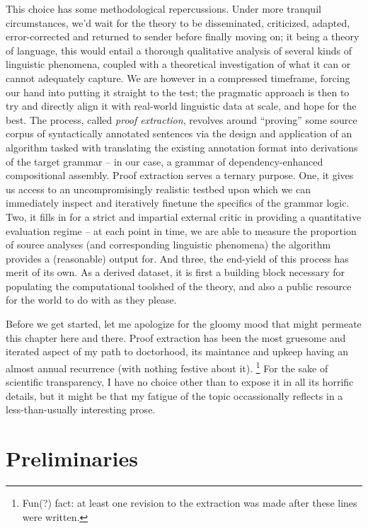 This choice has some methodological repercussions.
Under more tranquil circumstances, we'd wait for the theory to be disseminated, criticized, adapted, error-corrected and returned to sender before finally moving on; it being a theory of language, this would entail a thorough qualitative analysis of several kinds of linguistic phenomena, coupled with a theoretical investigation of what it can or cannot adequately capture.
We are however in a compressed timeframe, forcing our hand into putting it straight to the test; the pragmatic approach is then to try and directly align it with real-world linguistic data at scale, and hope for the best.
The process, called \textit{proof extraction}, revolves around ``proving''  some source corpus of syntactically annotated sentences via the design and application of an algorithm tasked with translating the existing annotation format into derivations of the target grammar -- in our case, a grammar of dependency-enhanced compositional assembly.
Proof extraction serves a ternary purpose.
One, it gives us access to an uncompromisingly realistic testbed upon which we can immediately inspect and iteratively finetune the specifics of the grammar logic.
Two, it fills in for a strict and impartial external critic in providing a quantitative evaluation regime -- at each point in time, we are able to measure the proportion of source analyses (and corresponding linguistic phenomena) the algorithm provides a (reasonable) output for.
And three, the end-yield of this process has merit of its own.
As a derived dataset, it is first a building block necessary for populating the computational toolshed of the theory, and also a public resource for the world to do with as they please.

Before we get started, let me apologize for the gloomy mood that might permeate this chapter here and there.
Proof extraction has been the most gruesome and iterated aspect of my path to doctorhood, its maintance and upkeep having an almost annual recurrence (with nothing festive about it).%
\footnote{Fun(?) fact: at least one revision to the extraction was made after these lines were written.}
For the sake of scientific transparency, I have no choice other than to expose it in all its horrific details, but it might be that my fatigue of the topic occassionally reflects in a less-than-usually interesting prose.

\section{Preliminaries}
